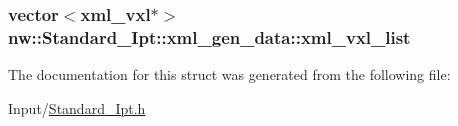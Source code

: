\hypertarget{structnw_1_1_standard___ipt_1_1xml__gen__data_af091596661fc87ef8c7f28317555c6af}{
\subsubsection[{xml\+\_\+vxl\+\_\+list}]{\setlength{\rightskip}{0pt plus 5cm}vector$<${\bf xml\+\_\+vxl}$\ast$$>$ nw\+::\+Standard\+\_\+\+Ipt\+::xml\+\_\+gen\+\_\+data\+::xml\+\_\+vxl\+\_\+list}}\label{structnw_1_1_standard___ipt_1_1xml__gen__data_af091596661fc87ef8c7f28317555c6af}


The documentation for this struct was generated from the following file\+:\begin{DoxyCompactItemize}
\item 
Input/\hyperlink{_standard___ipt_8h}{Standard\+\_\+\+Ipt.\+h}\end{DoxyCompactItemize}
